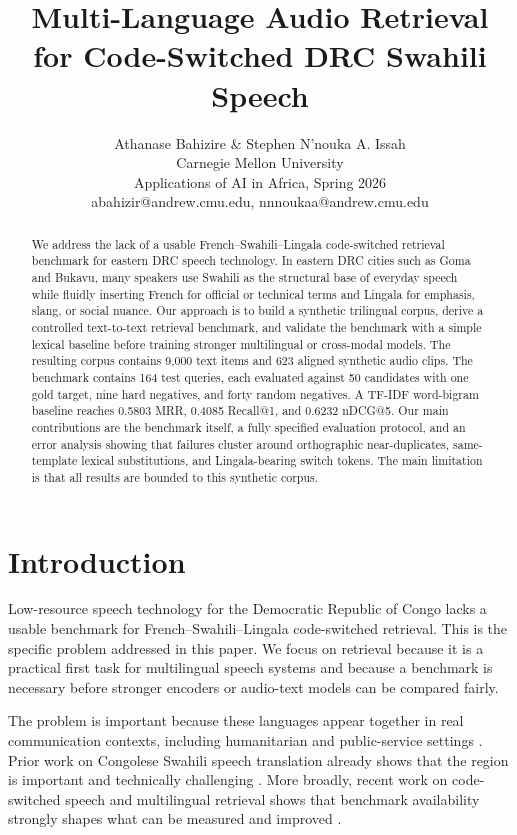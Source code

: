 \documentclass[11pt,twocolumn]{article}
\title{Multi-Language Audio Retrieval for Code-Switched DRC Swahili Speech}
\author{Athanase Bahizire \& Stephen N'nouka A. Issah\\
Carnegie Mellon University\\
Applications of AI in Africa, Spring 2026\\
abahizir@andrew.cmu.edu, nnnoukaa@andrew.cmu.edu}
\date{}
\begin{document}
\maketitle

\begin{abstract}
We address the lack of a usable French--Swahili--Lingala code-switched retrieval benchmark for eastern DRC speech technology. In eastern DRC cities such as Goma and Bukavu, many speakers use Swahili as the structural base of everyday speech while fluidly inserting French for official or technical terms and Lingala for emphasis, slang, or social nuance. Our approach is to build a synthetic trilingual corpus, derive a controlled text-to-text retrieval benchmark, and validate the benchmark with a simple lexical baseline before training stronger multilingual or cross-modal models. The resulting corpus contains 9{,}000 text items and 623 aligned synthetic audio clips. The benchmark contains 164 test queries, each evaluated against 50 candidates with one gold target, nine hard negatives, and forty random negatives. A TF-IDF word-bigram baseline reaches 0.5803 MRR, 0.4085 Recall@1, and 0.6232 nDCG@5. Our main contributions are the benchmark itself, a fully specified evaluation protocol, and an error analysis showing that failures cluster around orthographic near-duplicates, same-template lexical substitutions, and Lingala-bearing switch tokens. The main limitation is that all results are bounded to this synthetic corpus.
\end{abstract}

\section{Introduction}
Low-resource speech technology for the Democratic Republic of Congo lacks a usable benchmark for French--Swahili--Lingala code-switched retrieval. This is the specific problem addressed in this paper. We focus on retrieval because it is a practical first task for multilingual speech systems and because a benchmark is necessary before stronger encoders or audio-text models can be compared fairly.

The problem is important because these languages appear together in real communication contexts, including humanitarian and public-service settings \cite{kimanuka2025tods}. Prior work on Congolese Swahili speech translation already shows that the region is important and technically challenging \cite{denisov2021ims}. More broadly, recent work on code-switched speech and multilingual retrieval shows that benchmark availability strongly shapes what can be measured and improved \cite{yan2025csfleurs}\cite{hillah2024joint}\cite{cui2015multilingual}.
\end{document}
